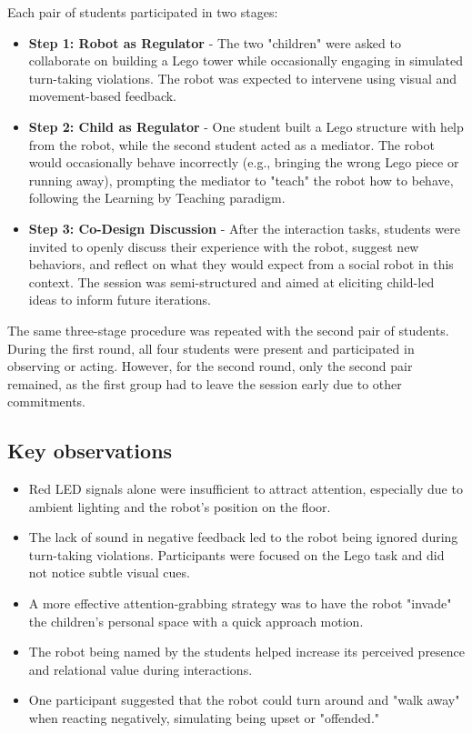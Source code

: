 \documentclass[a4paper]{usiinfbachelorproject}
\begin{document}
Each pair of students participated in two stages:
\begin{itemize}
    \item \textbf{Step 1: Robot as Regulator} - The two "children" were asked to collaborate on building a Lego tower while occasionally engaging in simulated turn-taking violations.
          The robot was expected to intervene using visual and movement-based feedback.
    \item \textbf{Step 2: Child as Regulator} - One student built a Lego structure with help from the robot, while the second student acted as a mediator.
          The robot would occasionally behave incorrectly (e.g., bringing the wrong Lego piece or running away), prompting the mediator to "teach" the robot how to behave, following the Learning by Teaching paradigm.
    \item \textbf{Step 3: Co-Design Discussion} - After the interaction tasks, students were invited to openly discuss their experience with the robot, suggest new behaviors, and reflect on what they would expect from a social robot in this context.
          The session was semi-structured and aimed at eliciting child-led ideas to inform future iterations.
\end{itemize}

The same three-stage procedure was repeated with the second pair of students.
During the first round, all four students were present and participated in observing or acting.
However, for the second round, only the second pair remained, as the first group had to leave the session early due to other commitments.

\subsection*{\textbf{Key observations}}
\begin{itemize}
    \item Red LED signals alone were insufficient to attract attention, especially due to ambient lighting and the robot's position on the floor.
    \item The lack of sound in negative feedback led to the robot being ignored during turn-taking violations. Participants were focused on the Lego task and did not notice subtle visual cues.
    \item A more effective attention-grabbing strategy was to have the robot "invade" the children's personal space with a quick approach motion.
    \item The robot being named by the students helped increase its perceived presence and relational value during interactions.
    \item One participant suggested that the robot could turn around and "walk away" when reacting negatively, simulating being upset or "offended."
\end{itemize}
\end{document}
